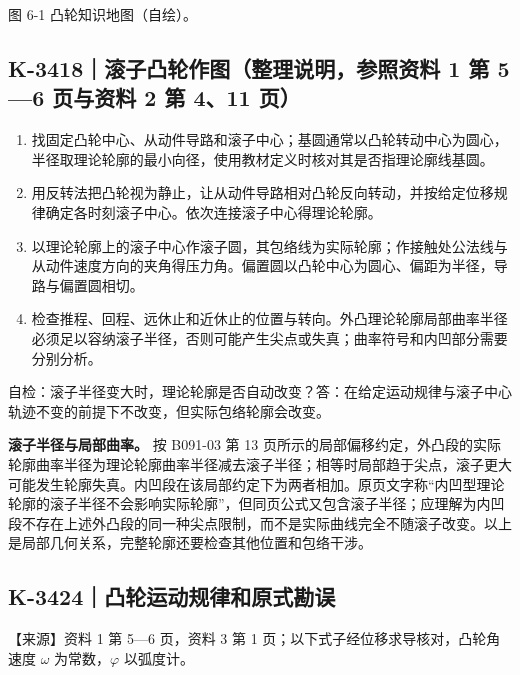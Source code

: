 \documentclass[zihao=5,a4paper,UTF8,fontset=fandol]{ctexart}
\begin{document}
图 6-1 凸轮知识地图（自绘）。





\subsection{K-3418｜滚子凸轮作图（整理说明，参照资料 1 第 5—6 页与资料 2 第 4、11 页）}
\label{k-3418}

\begin{enumerate}
\item 
找固定凸轮中心、从动件导路和滚子中心；基圆通常以凸轮转动中心为圆心，半径取理论轮廓的最小向径，使用教材定义时核对其是否指理论廓线基圆。


\item 
用反转法把凸轮视为静止，让从动件导路相对凸轮反向转动，并按给定位移规律确定各时刻滚子中心。依次连接滚子中心得理论轮廓。


\item 
以理论轮廓上的滚子中心作滚子圆，其包络线为实际轮廓；作接触处公法线与从动件速度方向的夹角得压力角。偏置圆以凸轮中心为圆心、偏距为半径，导路与偏置圆相切。


\item 
检查推程、回程、远休止和近休止的位置与转向。外凸理论轮廓局部曲率半径必须足以容纳滚子半径，否则可能产生尖点或失真；曲率符号和内凹部分需要分别分析。



\end{enumerate}

自检：滚子半径变大时，理论轮廓是否自动改变？答：在给定运动规律与滚子中心轨迹不变的前提下不改变，但实际包络轮廓会改变。


\textbf{滚子半径与局部曲率。} 按 B091-03 第 13 页所示的局部偏移约定，外凸段的实际轮廓曲率半径为理论轮廓曲率半径减去滚子半径；相等时局部趋于尖点，滚子更大可能发生轮廓失真。内凹段在该局部约定下为两者相加。原页文字称“内凹型理论轮廓的滚子半径不会影响实际轮廓”，但同页公式又包含滚子半径；应理解为内凹段不存在上述外凸段的同一种尖点限制，而不是实际曲线完全不随滚子改变。以上是局部几何关系，完整轮廓还要检查其他位置和包络干涉。





\subsection{K-3424｜凸轮运动规律和原式勘误}
\label{k-3424}

【来源】资料 1 第 5—6 页，资料 3 第 1 页；以下式子经位移求导核对，凸轮角速度 $\omega$ 为常数，$\varphi$ 以弧度计。
\end{document}
